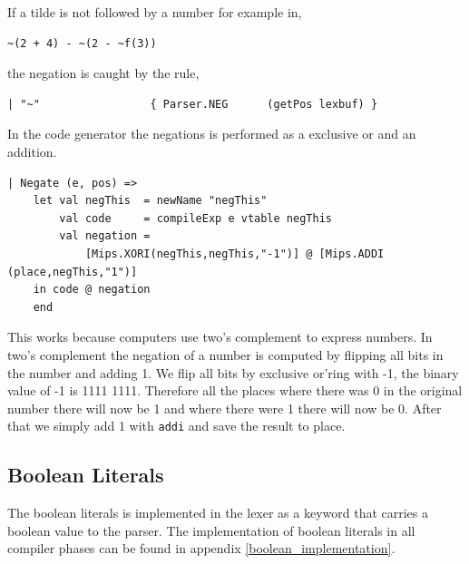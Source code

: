 \documentclass[11pt]{article}
\begin{document}
    If a tilde is not followed by a number for example in,

    \begin{lstlisting}
~(2 + 4) - ~(2 - ~f(3))
    \end{lstlisting}

    the negation is caught by the rule,

    \begin{lstlisting}[firstnumber=92]
| "~"                 { Parser.NEG      (getPos lexbuf) }
    \end{lstlisting}

    In the code generator the negations is performed as a exclusive or and an
    addition.

    \begin{lstlisting}[firstnumber=284]
| Negate (e, pos) =>
    let val negThis  = newName "negThis"
        val code     = compileExp e vtable negThis
        val negation =
            [Mips.XORI(negThis,negThis,"-1")] @ [Mips.ADDI (place,negThis,"1")]
    in code @ negation
    end
    \end{lstlisting}

    This works because computers use two's complement to express numbers.  In
    two's complement the negation of a number is computed by flipping all bits
    in the number and adding 1.  We flip all bits by exclusive or'ring with -1,
    the binary value of -1 is 1111 1111.  Therefore all the places where there
    was 0 in the original number there will now be 1 and where there were 1
    there will now be 0.  After that we simply add 1 with \texttt{addi} and save
    the result to place.

    \subsection{Boolean Literals}
    The boolean literals is implemented in the lexer as a keyword that carries a
    boolean value to the parser.  The implementation of boolean literals in all
    compiler phases can be found in appendix \ref{boolean_implementation}.
\end{document}
